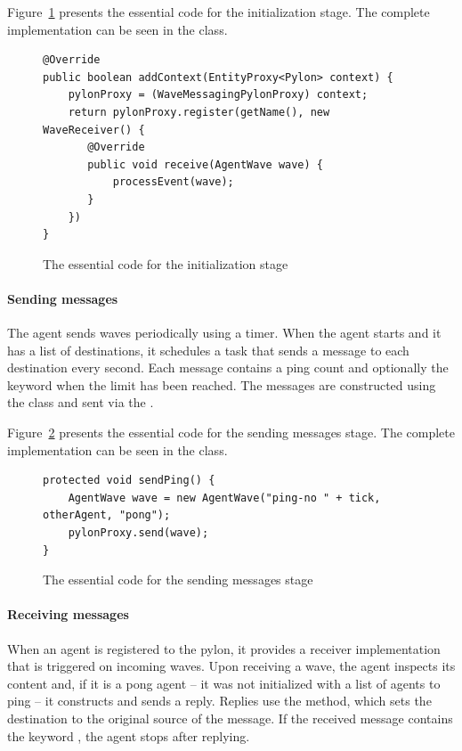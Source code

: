 \documentclass{article}
\begin{document}
Figure~\ref{fig:func:initialization:code} presents the essential code for the initialization stage. The complete implementation can be seen in the  class.

\begin{figure}[ht]\centering
\begin{lstlisting}
@Override
public boolean addContext(EntityProxy<Pylon> context) {
    pylonProxy = (WaveMessagingPylonProxy) context;
    return pylonProxy.register(getName(), new WaveReceiver() {
	   @Override
	   public void receive(AgentWave wave) {
		   processEvent(wave);
	   }
    })
}
\end{lstlisting}
\caption{The essential code for the initialization stage}\label{fig:func:initialization:code}
\end{figure}

\paragraph{Sending messages}

The  agent sends waves periodically using a timer. When the agent starts and it has a list of destinations, it schedules a task that sends a message to each destination every second. Each message contains a ping count and optionally the keyword  when the limit has been reached. The messages are constructed using the  class and sent via the . 

Figure~\ref{fig:func:sendPing:code} presents the essential code for the sending messages stage. The complete implementation can be seen in the  class.

\begin{figure}[ht]\centering
\begin{lstlisting}
protected void sendPing() {
    AgentWave wave = new AgentWave("ping-no " + tick, otherAgent, "pong");
    pylonProxy.send(wave);
}
\end{lstlisting}
\caption{The essential code for the sending messages stage}\label{fig:func:sendPing:code}
\end{figure}


\paragraph{Receiving messages} 

When an  agent is registered to the pylon, it provides a receiver implementation that is triggered on incoming waves. Upon receiving a wave, the agent inspects its content and, if it is a pong agent -- it was not initialized with a list of agents to ping -- it constructs and sends a reply. Replies use the  method, which sets the destination to the original source of the message. If the received message contains the keyword , the agent stops after replying.
\end{document}
